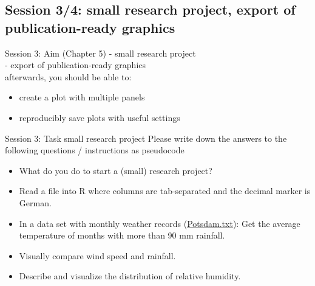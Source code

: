 \documentclass[xcolor=table,           xcolor=dvipsnames]{beamer}\usepackage[]{graphicx}\usepackage[]{color}
\newcommand{\datalink}[1]{\href{https://dl.dropboxusercontent.com/u/4836866/R_course_Berry/data/#1?dl=1}{#1}}
\begin{document}
\subsection{Session 3/4: small research project, export of publication-ready graphics}

\begin{frame}{Session 3: Aim (Chapter 5)}
\pause - small research project\\
\pause - export of publication-ready graphics\\
\pause afterwards, you should be able to:
\pause
\begin{itemize}[<+->]
\item create a plot with multiple panels
\item reproducibly save plots with useful settings
\end{itemize}
\end{frame}


\begin{frame}{Session 3: Task small research project}
Please write down the answers to the following questions / instructions as pseudocode
\begin{itemize}
\item What do you do to start a (small) research project?
\item Read a file into R where columns are tab-separated and the decimal marker is German.
\item In a data set with monthly weather records (\datalink{Potsdam.txt}): Get the average temperature of months with more than 90 mm rainfall.
\item Visually compare wind speed and rainfall.
\item Describe and visualize the distribution of relative humidity.
\end{itemize}
\end{frame}



\end{document}
